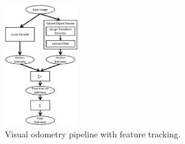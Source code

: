 \documentclass[letterpaper, 10 pt, conference]{ieeeconf}
\begin{document}
%
%
%
%
%


\begin{figure}[tb]
	\centering
	\includegraphics[height=200px]{approach_overview.png}
	\caption{Visual odometry pipeline with feature tracking.}
    \label{approach}
\end{figure}
\end{document}
